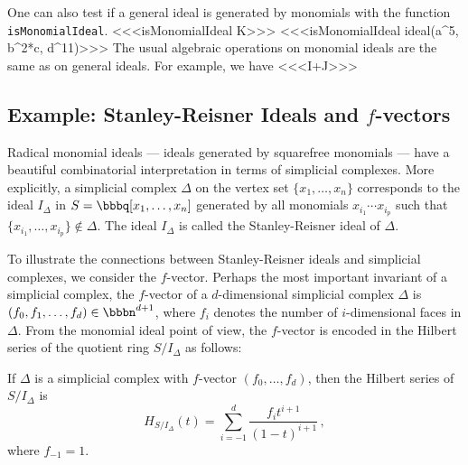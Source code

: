 One can also test if a general ideal is generated by monomials with
the function {\tt isMonomialIdeal}.
<<<isMonomialIdeal K>>>
<<<isMonomialIdeal ideal(a^5, b^2*c, d^11)>>>
The usual algebraic operations on monomial ideals are the same as on
general ideals. For example, we have
<<<I+J>>>


\subsection*{Example: Stanley-Reisner Ideals and $f$-vectors} 

Radical monomial ideals --- ideals generated by squarefree monomials
--- have a beautiful combinatorial interpretation in terms of
simplicial complexes.  More explicitly, a
simplicial complex $\Delta$ on the vertex set $\{ x_{1}, \dotsc, x_{n}
\}$ corresponds to the ideal $I_{\Delta}$ in $S = \bbbq[x_{1}, \dotsc,
x_{n}]$ generated by all monomials $x_{i_{1}} \dotsb x_{i_{p}}$ such
that $\{x_{i_{1}}, \dotsc, x_{i_{p}} \} \not\in \Delta$. The ideal
$I_{\Delta}$ is called the Stanley-Reisner ideal of $\Delta$.

To illustrate the connections between Stanley-Reisner ideals and
simplicial complexes, we consider the
$f$-vector.
Perhaps the most important invariant of a simplicial complex, the
$f$-vector of a $d$-dimensional simplicial complex $\Delta$ is
$(f_{0}, f_{1}, \dotsc, f_{d}) \in \bbbn^{d+1}$, where $f_{i}$ denotes
the number of $i$-dimensional faces in $\Delta$.  From the monomial
ideal point of view, the $f$-vector is encoded in the Hilbert
series of the quotient ring $S/I_{\Delta}$ as
follows:

\begin{theorem}
If $\Delta$ is a simplicial complex with $f$-vector $(f_{0}, \dotsc,
f_{d})$, then the Hilbert series of $S / I_{\Delta}$ is
\[
H_{S/I_{\Delta}}(t) = \sum_{i=-1}^{d} \frac{f_{i}t^{i+1}}{(1-t)^{i+1}}
\, ,
\]
where $f_{-1} = 1$.
\end{theorem}

